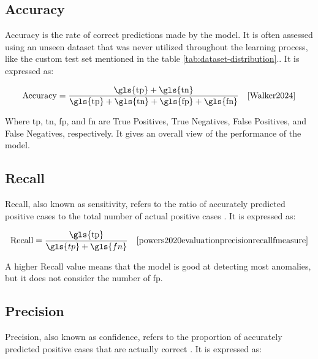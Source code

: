 \subsection*{Accuracy}
\label{subsec:Accuracy}

Accuracy is the rate of correct predictions made by the model. It is often assessed using an unseen dataset that was never utilized throughout the learning process, like the custom test set mentioned in the table \ref{tab:dataset-distribution}.\cite{Kohavi1998}. It is expressed as: 

\begin{equation}
    \text{Accuracy} = \frac{\text{\gls{tp}} + \text{\gls{tn}}}{\text{\gls{tp}} + \text{\gls{tn}} + \text{\gls{fp}} + \text{\gls{fn}}} \quad \text{\cite{Walker2024}}
    \label{eq:accuracy}
\end{equation}

Where \gls{tp}, \gls{tn}, \gls{fp}, and \gls{fn} are True Positives, True Negatives, False Positives, and False Negatives, respectively. It gives an overall view of the performance of the model.

\subsection*{Recall}
\label{subsec:Recall}

Recall, also known as sensitivity, refers to the ratio of accurately predicted positive cases to the total number of actual positive cases \cite{powers2020evaluationprecisionrecallfmeasure}. It is expressed as:

\begin{equation}
    \text{Recall} = \frac{\text{\gls{tp}}}{\gls{tp} + \gls{fn}} \quad \text{\cite{powers2020evaluationprecisionrecallfmeasure}}
    \label{eq:recall}
\end{equation}

A higher Recall value means that the model is good at detecting most anomalies, but it does not consider the number of \gls{fp}.

\subsection*{Precision}
\label{subsec:Precision}

Precision, also known as confidence, refers to the proportion of accurately predicted positive cases that are actually correct \cite{powers2020evaluationprecisionrecallfmeasure}. It is expressed as:


